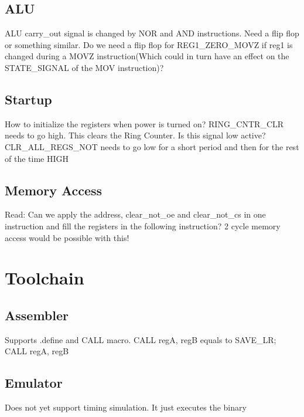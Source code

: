 \documentclass[a4paper, 12pt]{article}
\begin{document}
	\subsection{ALU}
	ALU carry\_out signal is changed by NOR and AND instructions. Need a flip flop or something similar.
	Do we need a flip flop for REG1\_ZERO\_MOVZ if reg1 is changed during a MOVZ instruction(Which could in turn have an effect on the STATE\_SIGNAL of the MOV instruction)?
	\subsection{Startup}
	How to initialize the registers when power is turned on?
	RING\_CNTR\_CLR needs to go high. This clears the Ring Counter. Is this signal low active?
	CLR\_ALL\_REGS\_NOT needs to go low for a short period and then for the rest of the time HIGH
	\subsection{Memory Access}
	Read: Can we apply the address, clear\_not\_oe and clear\_not\_cs in one instruction and fill the registers in the following instruction? 2 cycle memory access would be possible with this!
	\section{Toolchain}
	\subsection{Assembler}
	Supports .define  and CALL macro. CALL regA, regB equals to SAVE\_LR; CALL regA, regB
	\subsection{Emulator}
	Does not yet support timing simulation. It just executes the binary
\end{document}

